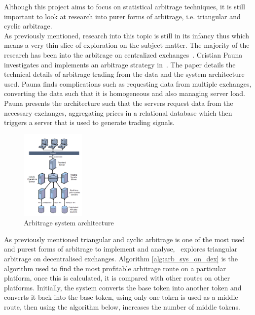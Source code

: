 Although this project aims to focus on statistical arbitrage techniques, it is still important to look at research into purer forms of arbitrage, i.e. triangular and cyclic arbitrage.
\\[5mm]
As previously mentioned, research into this topic is still in its infancy thus which means a very thin slice of exploration on the subject matter. The majority of the research has been into the arbitrage on centralized exchanges~\cite{MakarovIgor2020Taai, crepelliere_arbitrage_2022, PAUNACristian2018ATSf}. Cristian Pauna investigates and implements an arbitrage strategy in~\cite{PAUNACristian2018ATSf}. The paper details the technical details of arbitrage trading from the data and the system architecture used. Pauna finds complications such as requesting data from multiple exchanges, converting the data such that it is homogeneous and also managing server load. Pauna presents the architecture such that the servers request data from the necessary exchanges, aggregating prices in a relational database which then triggers a server that is used to generate trading signals.

\begin{figure}[!htb]
    \centering
    \includegraphics[width=0.28\textwidth]{background/Images/Arbitrage-Architecture.png}
    \caption{Arbitrage system architecture~\cite{PAUNACristian2018ATSf}}
\end{figure}

\noindent As previously mentioned triangular and cyclic arbitrage is one of the most used and purest forms of arbitrage to implement and analyse,~\cite{boonpeam2021arbitrage} explores triangular arbitrage on decentralised exchanges. Algorithm \ref{alg:arb_sys_on_dex} is the algorithm used to find the most profitable arbitrage route on a particular platform, once this is calculated, it is compared with other routes on other platforms. Initially, the system converts the base token into another token and converts it back into the base token, using only one token is used as a middle route, then using the algorithm below, increases the number of middle tokens.

